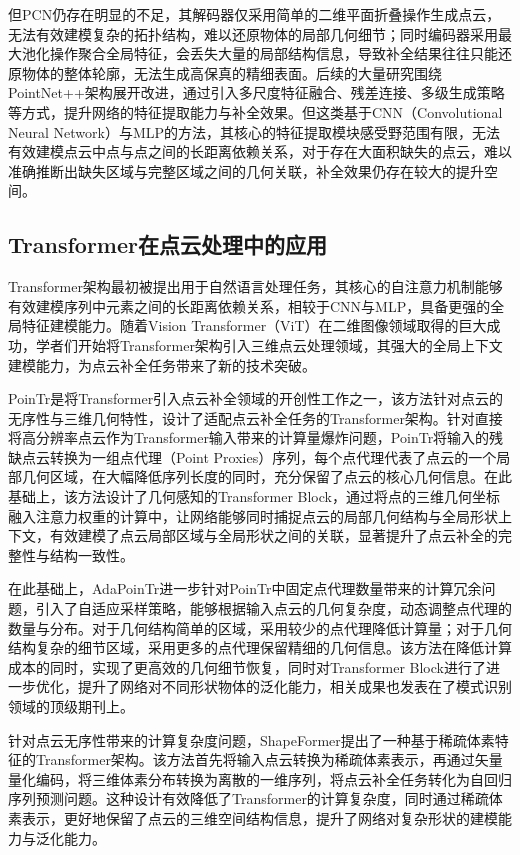 但PCN仍存在明显的不足，其解码器仅采用简单的二维平面折叠操作生成点云，无法有效建模复杂的拓扑结构，难以还原物体的局部几何细节；同时编码器采用最大池化操作聚合全局特征，会丢失大量的局部结构信息，导致补全结果往往只能还原物体的整体轮廓，无法生成高保真的精细表面\cite{yu2021pointr}。后续的大量研究围绕PointNet++架构展开改进，通过引入多尺度特征融合、残差连接、多级生成策略等方式，提升网络的特征提取能力与补全效果。但这类基于CNN（Convolutional Neural Network）与MLP的方法，其核心的特征提取模块感受野范围有限，无法有效建模点云中点与点之间的长距离依赖关系，对于存在大面积缺失的点云，难以准确推断出缺失区域与完整区域之间的几何关联，补全效果仍存在较大的提升空间\cite{chen2024geoformer}。

\subsection{Transformer在点云处理中的应用}
Transformer架构最初被提出用于自然语言处理任务，其核心的自注意力机制能够有效建模序列中元素之间的长距离依赖关系，相较于CNN与MLP，具备更强的全局特征建模能力。随着Vision Transformer（ViT）在二维图像领域取得的巨大成功，学者们开始将Transformer架构引入三维点云处理领域，其强大的全局上下文建模能力，为点云补全任务带来了新的技术突破\cite{yu2023adapointr}。

PoinTr是将Transformer引入点云补全领域的开创性工作之一，该方法针对点云的无序性与三维几何特性，设计了适配点云补全任务的Transformer架构。针对直接将高分辨率点云作为Transformer输入带来的计算量爆炸问题，PoinTr将输入的残缺点云转换为一组点代理（Point Proxies）序列，每个点代理代表了点云的一个局部几何区域，在大幅降低序列长度的同时，充分保留了点云的核心几何信息。在此基础上，该方法设计了几何感知的Transformer Block，通过将点的三维几何坐标融入注意力权重的计算中，让网络能够同时捕捉点云的局部几何结构与全局形状上下文，有效建模了点云局部区域与全局形状之间的关联，显著提升了点云补全的完整性与结构一致性\cite{yu2021pointr}。

在此基础上，AdaPoinTr进一步针对PoinTr中固定点代理数量带来的计算冗余问题，引入了自适应采样策略，能够根据输入点云的几何复杂度，动态调整点代理的数量与分布。对于几何结构简单的区域，采用较少的点代理降低计算量；对于几何结构复杂的细节区域，采用更多的点代理保留精细的几何信息。该方法在降低计算成本的同时，实现了更高效的几何细节恢复，同时对Transformer Block进行了进一步优化，提升了网络对不同形状物体的泛化能力，相关成果也发表在了模式识别领域的顶级期刊上\cite{yu2023adapointr}。

针对点云无序性带来的计算复杂度问题，ShapeFormer提出了一种基于稀疏体素特征的Transformer架构。该方法首先将输入点云转换为稀疏体素表示，再通过矢量量化编码，将三维体素分布转换为离散的一维序列，将点云补全任务转化为自回归序列预测问题。这种设计有效降低了Transformer的计算复杂度，同时通过稀疏体素表示，更好地保留了点云的三维空间结构信息，提升了网络对复杂形状的建模能力与泛化能力\cite{yan2022shapeformer}。

